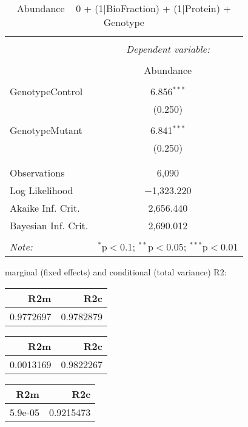 \documentclass[11pt]{report}
\begin{document}
\begin{table}[!htbp] \centering 
  \caption{Abundance ~ 0 + (1|BioFraction) + (1|Protein) + Genotype} 
  \label{} 
\begin{tabular}{@{\extracolsep{5pt}}lc} 
\\[-1.8ex]\hline 
\hline \\[-1.8ex] 
 & \multicolumn{1}{c}{\textit{Dependent variable:}} \\ 
\cline{2-2} 
\\[-1.8ex] & Abundance \\ 
\hline \\[-1.8ex] 
 GenotypeControl & 6.856$^{***}$ \\ 
  & (0.250) \\ 
  & \\ 
 GenotypeMutant & 6.841$^{***}$ \\ 
  & (0.250) \\ 
  & \\ 
\hline \\[-1.8ex] 
Observations & 6,090 \\ 
Log Likelihood & $-$1,323.220 \\ 
Akaike Inf. Crit. & 2,656.440 \\ 
Bayesian Inf. Crit. & 2,690.012 \\ 
\hline 
\hline \\[-1.8ex] 
\textit{Note:}  & \multicolumn{1}{r}{$^{*}$p$<$0.1; $^{**}$p$<$0.05; $^{***}$p$<$0.01} \\ 
\end{tabular} 
\end{table} 
marginal (fixed effects) and conditional (total variance) R2:

\begin{tabular}{r|r}
\hline
R2m & R2c\\
\hline
0.9772697 & 0.9782879\\
\hline
\end{tabular}

\begin{tabular}{r|r}
\hline
R2m & R2c\\
\hline
0.0013169 & 0.9822267\\
\hline
\end{tabular}

\begin{tabular}{r|r}
\hline
R2m & R2c\\
\hline
5.9e-05 & 0.9215473\\
\hline
\end{tabular}
\end{document}
